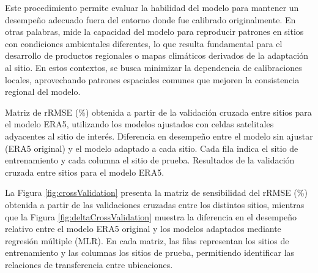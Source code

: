 \documentclass[letterpaper,12pt, twoside]{report}
\providecommand{\DIFdeltex}[1]{{\protect\color{red} \scriptsize #1}} %
\providecommand{\DIFdelFL}[1]{\DIFdel{#1}} %
\providecommand{\DIFdel}[1]{\texorpdfstring{\DIFdeltex{#1}}{}} %
\begin{document}
\DIFdel{Este procedimiento permite evaluar la habilidad del modelo para mantener un desempeño adecuado fuera del entorno donde fue calibrado originalmente. En otras palabras, mide la capacidad del modelo para reproducir patrones en sitios con condiciones ambientales diferentes, lo que resulta fundamental para el desarrollo de productos regionales o mapas climáticos derivados de la adaptación al sitio. En estos contextos, se busca minimizar la dependencia de calibraciones locales, aprovechando patrones espaciales comunes que mejoren la consistencia regional del modelo.
}%

{%
\DIFdelFL{Matriz de rRMSE (\%) obtenida a partir de la validación cruzada entre sitios para el modelo ERA5, utilizando los modelos ajustados con celdas satelitales adyacentes al sitio de interés.}}
{%
\DIFdelFL{Diferencia en desempeño entre el modelo sin ajustar (ERA5 original) y el modelo adaptado a cada sitio. Cada fila indica el sitio de entrenamiento y cada columna el sitio de prueba.}}
{%
\DIFdelFL{Resultados de la validación cruzada entre sitios para el modelo ERA5.}}

\DIFdel{La Figura \ref{fig:crossValidation} presenta la matriz de sensibilidad del rRMSE (\%) obtenida a partir de las validaciones cruzadas entre los distintos sitios, mientras que la Figura \ref{fig:deltaCrossValidation} muestra la diferencia en el desempeño relativo entre el modelo ERA5 original y los modelos adaptados mediante regresión múltiple (MLR). En cada matriz, las filas representan los sitios de entrenamiento y las columnas los sitios de prueba, permitiendo identificar las relaciones de transferencia entre ubicaciones.
}%
\end{document}
